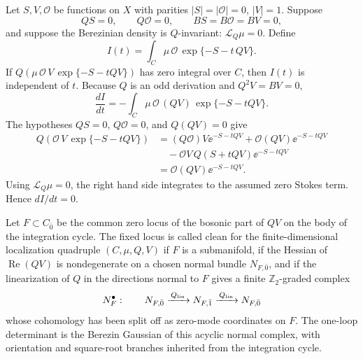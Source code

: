 \begin{remark}
\label{rem:susy-localization-deformation-identity}
Let \(S,V,\mathcal O\) be functions on \(X\) with parities
\(|S|=|\mathcal O|=0\), \(|V|=1\).  Suppose
\[
  Q S=0,\qquad Q\mathcal O=0,\qquad
  B S=B\mathcal O=BV=0,
\]
and suppose the Berezinian density is \(Q\)-invariant:
\(\mathcal L_Q\mu=0\).  Define
\[
  I(t)=\int_C\mu\,\mathcal O\,\exp\{-S-t\,QV\}.
\]
If \(Q(\mu\,\mathcal O\,V\,\exp\{-S-tQV\})\) has zero integral over \(C\),
then \(I(t)\) is independent of \(t\).
Because \(Q\) is an odd derivation and \(Q^2V=BV=0\),
\[
  \frac{dI}{dt}
  =
  -\int_C\mu\,\mathcal O\,(QV)\,\exp\{-S-tQV\}.
\]
The hypotheses \(QS=0\), \(Q\mathcal O=0\), and \(Q(QV)=0\) give
\[
\begin{aligned}
  Q\!\left(\mathcal O\,V\,\exp\{-S-tQV\}\right)
  &=
  (Q\mathcal O)V\ee^{-S-tQV}
  +\mathcal O(QV)\ee^{-S-tQV} \\
  &\quad
  -\mathcal O V\,Q(S+tQV)\ee^{-S-tQV} \\
  &=
  \mathcal O(QV)\ee^{-S-tQV}.
\end{aligned}
\]
Using \(\mathcal L_Q\mu=0\), the right hand side integrates to the assumed
zero Stokes term.  Hence \(dI/dt=0\).
\end{remark}

\begin{definition}
\label{def:clean-fixed-locus-normal-complex}
Let \(F\subset C_{\bar 0}\) be the common zero locus of the bosonic part of
\(QV\) on the body of the integration cycle.  The fixed locus is called clean
for the finite-dimensional localization quadruple \((C,\mu,Q,V)\) if \(F\) is a submanifold, if the Hessian of
\(\operatorname{Re}(QV)\) is nondegenerate on a chosen normal bundle
\(N_{F,\bar 0}\), and if the linearization of \(Q\) in the directions normal
to \(F\) gives a finite \(\mathbb Z_2\)-graded complex
\[
  N_F^\bullet:\qquad
  N_{F,\bar 0}\xrightarrow{\,Q_{\rm lin}\,}N_{F,\bar 1}
  \xrightarrow{\,Q_{\rm lin}\,}N_{F,\bar 0}
\]
whose cohomology has been split off as zero-mode coordinates on \(F\).  The
one-loop determinant is the Berezin Gaussian of this acyclic normal complex,
with orientation and square-root branches inherited from the integration
cycle.
\end{definition}

